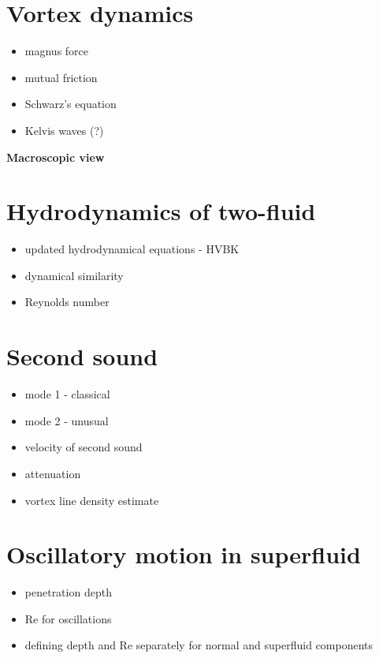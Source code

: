 \documentclass[a4paper, 12pt]{report}
\newcommand{\<}{\langle} %
\renewcommand{\>}{\rangle} %
\begin{document}
\section{Vortex dynamics}
\begin{itemize}
	\item magnus force
	\item mutual friction
	\item Schwarz's equation
	\item Kelvis waves (?)
\end{itemize}

\newpage

{\Huge \bfseries Macroscopic view}
\vspace{0.3cm}

\section{Hydrodynamics of two-fluid}
\begin{itemize}
	\item updated hydrodynamical equations - HVBK
	\item dynamical similarity
	\item Reynolds number
\end{itemize}

\section{Second sound}
\begin{itemize}
	\item mode 1 - classical
	\item mode 2 - unusual
	\item velocity of second sound
	\item attenuation
	\item vortex line density estimate
\end{itemize}

\section{Oscillatory motion in superfluid}
\begin{itemize}
	\item penetration depth
	\item Re for oscillations
	\item defining depth and Re separately for normal and superfluid components
\end{itemize}
\end{document}
